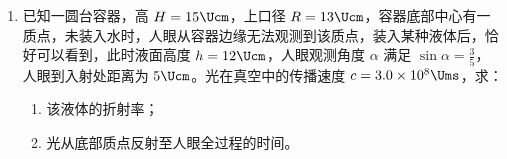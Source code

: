 \documentclass[\gkver]{gaokaozhenti}
\begin{document}
\begin{enumerate}
{根据电路分析，当闭合 S$_{1}$，将 S$_{2}$ 接 c 端时，电压表、电流表的读数分别为 $U_{c}$、$I_{c}$，则

$\frac{U_{c}}{I_{c}} = R_{x} + R_{A} + R_{\text{滑}}$

将 S$_{2}$ 接 d 端时，电压表、电流表的读数分别为 $U_{d}$、$I_{d}$，则

$\frac{U_{d}}{I_{d}} = R_{A} + R_{\text{滑}}$

那么待测电阻阻值 $R_{x} = \frac{U_{c}}{I_{c}} - \frac{U_{d}}{I_{d}}$。
}

\item
已知一圆台容器，高 $H = 15 \Ucm$，上口径 $R = 13 \Ucm$，容器底部中心有一质点，未装入水时，人眼从容器边缘无法观测到该质点，装入某种液体后，恰好可以看到，此时液面高度 $h = 12 \Ucm$，人眼观测角度 $\alpha$ 满足 $\sin \alpha = \frac{3}{5}$，人眼到入射处距离为 $5 \Ucm$。光在真空中的传播速度 $c = 3.0 \times 10^{8} \Ums$，求：

\begin{enumerate}
\item
该液体的折射率；
\item
光从底部质点反射至人眼全过程的时间。
\end{enumerate}


\end{enumerate}
\end{document}
